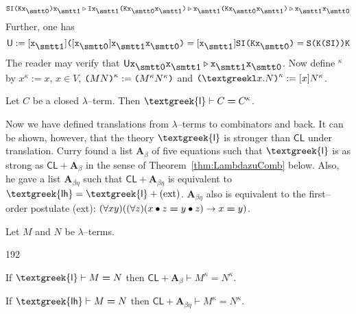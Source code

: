 \begin{equation}
\mbox{\tt SI(Kx$_{\snull}$)x$_{\seins}$}
\triangleright
\mbox{\tt Ix$_{\seins}$(Kx$_{\snull}$x$_{\seins}$)}
\triangleright
\mbox{\tt x$_{\seins}$(Kx$_{\snull}$x$_{\seins}$)} 
\triangleright 
\mbox{\tt x$_{\seins}$x$_{\snull}$}
\end{equation}
Further, one has
\begin{equation}
\mathsf{U} := [\mbox{\tt x$_{\seins}$}]\mbox{\tt (}[\mbox{\tt %
x$_{\snull}$}]\mbox{\tt x$_{\seins}$x$_{\snull}$)} 
= [\mbox{\tt x$_{\seins}$}]\mbox{\tt SI(Kx$_{\snull}$)} 
= \mbox{\tt S(K(SI))K}
\end{equation}
The reader may verify that 
$\mathsf{U}\mbox{\tt x$_{\snull}$x$_{\seins}$}
\triangleright \mbox{\tt x$_{\seins}$x$_{\snull}$}$. Now define
$^{\kappa}$ by $x^{\kappa} := x$, $x \in V$, $\mbox{\tt (}MN%
\mbox{\tt )}^{\kappa} := \mbox{\tt (}M^{\kappa}N^{\kappa}\mbox{\tt )}$
and $\mbox{\tt (\stlambda}x.N\mbox{\tt )}^{\kappa} :=
[x]N^{\kappa}$.
\begin{thm}
Let $C$ be a closed $\lambda$--term. Then
$\mbox{\sf\textgreek{l}} \vdash C \boldsymbol{=} C^{\kappa}$.
\end{thm}
Now we have defined translations from $\lambda$--terms to
combinators and back. It can be shown, however, that the theory
$\mbox{\sf\textgreek{l}}$ is stronger than $\mathsf{CL}$ under 
translation. Curry found a list $\mathbf{A}_{\beta}$ of five equations such
that $\mbox{\sf\textgreek{l}}$ is as strong as $\mathsf{CL} +
\mathbf{A}_{\beta}$ in the sense of
Theorem~\ref{thm:LambdazuComb} below. Also, he gave a list
$\mathbf{A}_{\beta\eta}$ such that $\mathsf{CL} + 
\mathbf{A}_{\beta\eta}$ is equivalent to $\mbox{\sf\textgreek{lh}} =
\mbox{\sf\textgreek{l}} + \mbox{\rm (ext)}$. $\mathbf{A}_{\beta\eta}$ 
also is equivalent to the first--order postulate (ext): $(\forall
xy)((\forall z)(x \bullet z \boldsymbol{=} y \bullet z) \rightarrow x 
\boldsymbol{=} y)$.
\begin{thm}[Curry]
\label{thm:LambdazuComb}
Let $M$ and $N$ be $\lambda$--terms.
\begin{dingautolist}{192}
\item
If $\mbox{\sf\textgreek{l}} \vdash M \boldsymbol{=} N$ then
$\mathsf{CL} + \mathbf{A}_{\beta}
\vdash M^{\kappa} \boldsymbol{=} N^{\kappa}$.
\item
If $\mbox{\sf\textgreek{lh}} \vdash M \boldsymbol{=} N$ then $\mathsf{CL} +
\mathbf{A}_{\beta\eta} \vdash M^{\kappa} \boldsymbol{=} N^{\kappa}$.
\end{dingautolist}
\end{thm}
